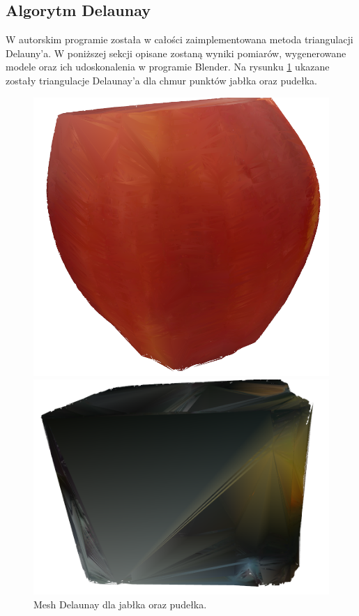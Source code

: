 \subsection{Algorytm Delaunay}
W autorskim programie została w całości zaimplementowana metoda triangulacji Delauny'a. W poniższej sekcji opisane zostaną wyniki pomiarów, wygenerowane modele oraz ich udoskonalenia w programie Blender. Na rysunku \ref{fig:delaBoxApple} ukazane zostały triangulacje Delaunay'a dla chmur punktów jabłka oraz pudełka.
\begin{figure}[H]
\centering
    \begin{minipage}[b]{0.45\linewidth}
        \includegraphics[scale=0.4]{jablkoDelNowe.PNG}
    \end{minipage}
\quad
    \begin{minipage}[b]{0.45\linewidth}
        \includegraphics[scale=0.4]{delaunayBox.PNG}
    \end{minipage}
\caption{Mesh Delaunay dla jabłka oraz pudełka.}
\label{fig:delaBoxApple}
\end{figure}
